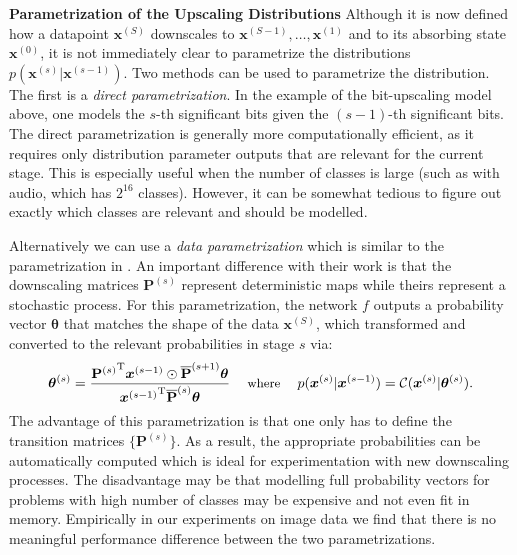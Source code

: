 \documentclass{article} \usepackage{iclr2022_conference,times}
\def\vx{{\bm{x}}}
\begin{document}
\textbf{Parametrization of the Upscaling Distributions} \hspace{.2cm}
Although it is now defined how a datapoint $\vx^{(S)}$ downscales to $\vx^{(S-1)}, \ldots, \vx^{(1)}$ and to its absorbing state $\vx^{(0)}$, it is not immediately clear to parametrize the distributions $p(\vx^{(s)} | \vx^{(s-1)})$. Two methods can be used to parametrize the distribution. The first is a \textit{direct parametrization}. In the example of the bit-upscaling model above, one models the $s$-th significant bits given the $(s-1)$-th significant bits. The direct parametrization is generally more computationally efficient, as it requires only distribution parameter outputs that are relevant for the current stage. This is especially useful when the number of classes is large (such as with audio, which has $2^{16}$ classes). However, it can be somewhat tedious to figure out exactly which classes are relevant and should be modelled.

Alternatively we can use a \textit{data parametrization} which is similar to the parametrization in \citet{austin2021structured}. An important difference with their work is that the downscaling matrices $\mathbf{P}^{(s)}$ represent deterministic maps while theirs represent a stochastic process. For this parametrization, the network $f$ outputs a probability vector $\boldsymbol{\theta}$ that matches the shape of the data $\vx^{(S)}$, which transformed and converted to the relevant probabilities in stage $s$ via:
\begin{equation*}
\small
\boldsymbol{\theta}^{(s)} = \frac{{\mathbf{P}^{(s)}}^\mathrm{T} \vx^{(s-1)} \odot \overline{\mathbf{P}}^{(s+1)} \boldsymbol{\theta}}{{\vx^{(s-1)}}^\mathrm{T} \overline{\mathbf{P}}^{(s)} \boldsymbol{\theta}} \quad \text{ where } \quad p(\vx^{(s)} | \vx^{(s-1)}) = \mathcal{C}(\vx^{(s)} | \boldsymbol{\theta}^{(s)}).  
\end{equation*}
The advantage of this parametrization is that one only has to define the transition matrices $\{ \mathbf{P}^{(s)} \}$. As a result, the appropriate probabilities can be automatically computed which is ideal for experimentation with new downscaling processes. The disadvantage may be that modelling full probability vectors for problems with high number of classes may be expensive and not even fit in memory. Empirically in our experiments on image data we find that there is no meaningful performance difference between the two parametrizations.
 
\end{document}
